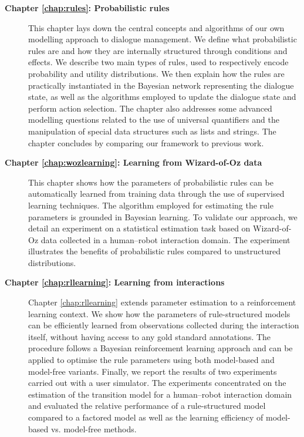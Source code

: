 \begin{description}
  \item[\textbf{Chapter \ref{chap:rules}: Probabilistic rules}] \hfill \vspace{2mm}
 
  This chapter lays down the central concepts and algorithms of our own modelling approach to dialogue management. We define what probabilistic rules are and how they are internally structured through conditions and effects.  We describe two main types of rules, used to respectively encode probability and utility distributions. We then explain how the rules are practically instantiated in the Bayesian network representing the dialogue state, as well as the algorithms employed to update the dialogue state and perform action selection. The chapter also addresses some advanced modelling questions related to the use of universal quantifiers and the manipulation of special data structures such as lists and strings.  The chapter concludes by comparing our framework to previous work. \vspace{2mm}
  
  \item[\textbf{Chapter \ref{chap:wozlearning}: Learning from Wizard-of-Oz data}] \hfill  \vspace{2mm}
  
 This chapter shows how the parameters of probabilistic rules can be automatically learned from training data through the use of supervised learning techniques. The algorithm employed for estimating the rule parameters is grounded in Bayesian learning.  To validate our approach, we detail an experiment on a statistical estimation task based on Wizard-of-Oz data collected in a human--robot interaction domain.  The experiment illustrates the benefits of probabilistic rules compared to unstructured distributions.  \vspace{2mm}

\item [\textbf{Chapter \ref{chap:rllearning}: Learning from interactions}] \hfill  \vspace{2mm}

Chapter \ref{chap:rllearning} extends parameter estimation to a reinforcement learning context.  We show how the parameters of rule-structured models can be efficiently learned from observations collected during the interaction itself, without having access to any gold standard annotations.  The procedure follows a Bayesian reinforcement learning approach and can be applied to optimise the rule parameters using both model-based and model-free variants. Finally, we report the results of two experiments carried out with a user simulator.  The experiments concentrated on the estimation of the transition model for a human--robot interaction domain and evaluated the relative performance of a rule-structured model compared to a factored model as well as the learning efficiency of model-based vs. model-free methods.   \vspace{2mm}



\end{description}
